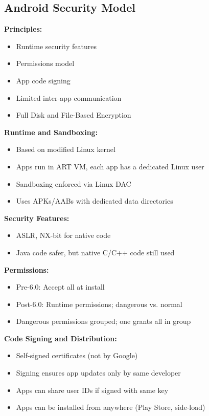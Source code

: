 \subsection{Android Security Model}
{
\textbf{Principles:}
\begin{itemize}[noitemsep]
  \item Runtime security features
  \item Permissions model
  \item App code signing
  \item Limited inter-app communication
  \item Full Disk and File-Based Encryption
\end{itemize}

\textbf{Runtime and Sandboxing:}
\begin{itemize}[noitemsep]
  \item Based on modified Linux kernel
  \item Apps run in ART VM, each app has a dedicated Linux user
  \item Sandboxing enforced via Linux DAC
  \item Uses APKs/AABs with dedicated data directories
\end{itemize}

\textbf{Security Features:}
\begin{itemize}[noitemsep]
  \item ASLR, NX-bit for native code
  \item Java code safer, but native C/C++ code still used
\end{itemize}

\textbf{Permissions:}
\begin{itemize}[noitemsep]
  \item Pre-6.0: Accept all at install
  \item Post-6.0: Runtime permissions; dangerous vs. normal
  \item Dangerous permissions grouped; one grants all in group
\end{itemize}

\textbf{Code Signing and Distribution:}
\begin{itemize}[noitemsep]
  \item Self-signed certificates (not by Google)
  \item Signing ensures app updates only by same developer
  \item Apps can share user IDs if signed with same key
  \item Apps can be installed from anywhere (Play Store, side-load)
\end{itemize}

}
